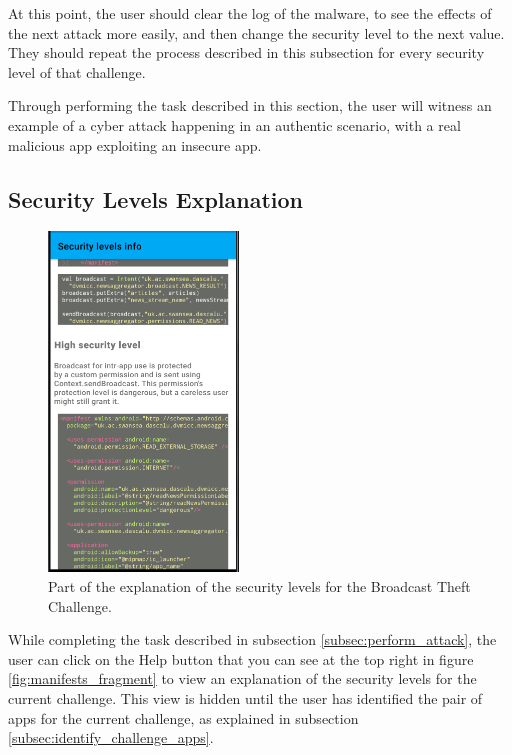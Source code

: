     At this point, the user should clear the log of the malware, to see the effects of the next attack more easily, and then change the security level to the next value. They should repeat the process described in this subsection for every security level of that challenge.
    
    Through performing the task described in this section, the user will witness an example of a cyber attack happening in an authentic scenario, with a real malicious app exploiting an insecure app. 
    
    \subsection{Security Levels Explanation}
        \label{subsec:security_levels_explanation}
        
    \begin{figure}
        \centering
        \includegraphics[width=0.45\textwidth]{graphics/security_level_explanation.PNG}
        \caption{Part of the explanation of the security levels for the Broadcast Theft Challenge.}
        \label{fig:security_levels}
    \end{figure}
        
    While completing the task described in subsection \ref{subsec:perform_attack}, the user can click on the Help button that you can see at the top right in figure \ref{fig:manifests_fragment} to view an explanation of the security levels for the current challenge.
    This view is hidden until the user has identified the pair of apps for the current challenge, as explained in subsection \ref{subsec:identify_challenge_apps}.
    
